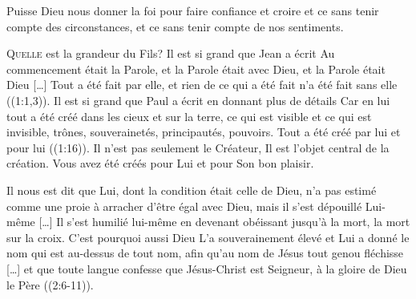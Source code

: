 Puisse Dieu nous donner la foi pour faire confiance et croire
 \ocadr et ce sans tenir compte des circonstances,
 et ce sans tenir compte de nos sentiments.

\dvrule






\lettrine{Q}{uelle} est la grandeur du Fils?
 Il est si grand que Jean a écrit\frcolon{} 
 \Og Au commencement était la Parole, et la Parole était avec Dieu,
 et la Parole était Dieu [\dots{}] Tout a été fait par elle,
 et rien de ce qui a été fait n'a été fait sans elle \Fg{}
 ((1:1,3)). Il est si grand que Paul a écrit en donnant
 plus de détails\frcolon{} 
 \Og Car en lui tout a été créé dans les cieux et sur la terre,
 ce qui est visible et ce qui est invisible, trônes, souverainetés,
 principautés, pouvoirs. Tout a été créé par lui et pour lui \Fg{}
 ((1:16)). Il n'est pas seulement le Créateur,
 Il est l'objet central de la création.
 Vous avez été créés pour Lui et pour Son bon plaisir.

Il nous est dit que \Og Lui, dont la condition était celle de Dieu,
 n'a pas estimé comme une proie à arracher d'être égal avec Dieu,
 mais il s'est dépouillé Lui-même [\dots{}] Il s'est humilié lui-même
 en devenant obéissant jusqu'à la mort, la mort sur la croix.
 C'est pourquoi aussi Dieu L'a souverainement élevé et Lui a donné le nom
 qui est au-dessus de tout nom, afin qu'au nom de Jésus tout genou
 fléchisse [\dots{}] et que toute langue confesse que Jésus-Christ
 est Seigneur, à la gloire de Dieu le Père \Fg{} ((2:6-11)).


\dvrule




